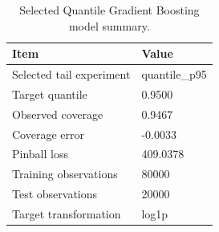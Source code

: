 \begin{table}
\caption{Selected Quantile Gradient Boosting model summary.}
\label{tab:06-selected-tail-summary}
\begin{tabular}{ll}
\toprule
Item & Value \\
\midrule
Selected tail experiment & quantile_p95 \\
Target quantile & 0.9500 \\
Observed coverage & 0.9467 \\
Coverage error & -0.0033 \\
Pinball loss & 409.0378 \\
Training observations & 80000 \\
Test observations & 20000 \\
Target transformation & log1p \\
\bottomrule
\end{tabular}
\end{table}
